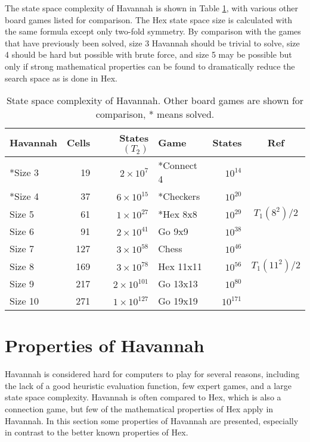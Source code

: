 The state space complexity of Havannah is shown in Table \ref{table:complexity}, with various other board games listed for comparison. The Hex state space size is calculated with the same formula except only two-fold symmetry. By comparison with the games that have previously been solved, size 3 Havannah should be trivial to solve, size 4 should be hard but possible with brute force, and size 5 may be possible but only if strong mathematical properties can be found to dramatically reduce the search space as is done in Hex.

\begin{table}
	\centering
	\begin{tabular}{lrr|lrc}
	Havannah  & Cells & States $(T_2)$      & Game       & States     & Ref \\ \hline
	*Size 3   &    19 & $2 \times 10^{7}$   & *Connect 4 & $10^{14}$  & \cite{trompconnect4} \\
	*Size 4   &    37 & $6 \times 10^{15}$  & *Checkers  & $10^{20}$  & \cite{schaeffer1998solving}\\
	Size 5    &    61 & $1 \times 10^{27}$  & *Hex 8x8   & $10^{29}$  & \cite{henderson2009solving} $T_1(8^2)/2$\\
	Size 6    &    91 & $2 \times 10^{41}$  & Go 9x9     & $10^{38}$  & \cite{tromp2007combinatorics}\\
	Size 7    &   127 & $3 \times 10^{58}$  & Chess      & $10^{46}$  & \cite{tromp2010chess}\\
	Size 8    &   169 & $3 \times 10^{78}$  & Hex 11x11  & $10^{56}$  & $T_1(11^2)/2$\\
	Size 9    &   217 & $2 \times 10^{101}$ & Go 13x13   & $10^{80}$  & \cite{tromp2007combinatorics}\\
	Size 10   &   271 & $1 \times 10^{127}$ & Go 19x19   & $10^{171}$ & \cite{tromp2007combinatorics}\\
	\end{tabular}
	\caption{State space complexity of Havannah. Other board games are shown for comparison, * means solved.}
	\label{table:complexity}
\end{table}

\section{Properties of Havannah}

Havannah is considered hard for computers to play for several reasons, including the lack of a good heuristic evaluation function, few expert games, and a large state space complexity. Havannah is often compared to Hex, which is also a connection game, but few of the mathematical properties of Hex apply in Havannah. In this section some properties of Havannah are presented, especially in contrast to the better known properties of Hex.




